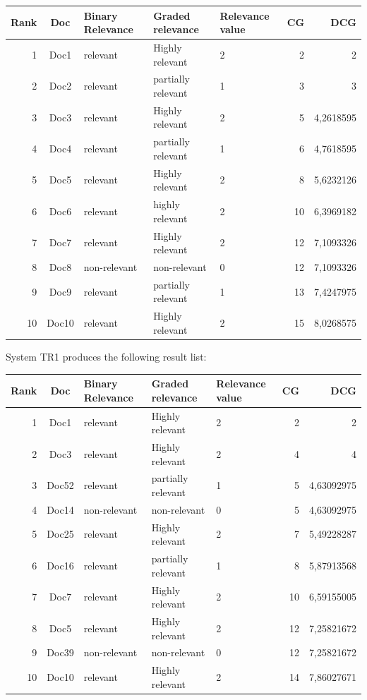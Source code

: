 \documentclass[a4paper,11pt]{article}
\begin{document}
\begin{tabular}{|r|c|p{1.8cm}|p{1.8cm}|p{1.8cm}|r|r|}
\hline
\textbf{Rank} & \textbf{Doc} & \textbf{Binary Relevance} & \textbf{Graded relevance} & \textbf{Relevance value} & \textbf{CG} & \textbf{DCG} \\ \hline
1 & Doc1 & relevant & Highly relevant & 2 & 2 & 2 \\ \hline
2 & Doc2 & relevant & partially relevant & 1 & 3 & 3 \\ \hline
3 & Doc3 & relevant & Highly relevant & 2 & 5 & 4,2618595 \\ \hline
4 & Doc4 & relevant & partially relevant & 1 & 6 & 4,7618595 \\ \hline
5 & Doc5 & relevant & Highly relevant & 2 & 8 & 5,6232126 \\ \hline
6 & Doc6 & relevant & highly relevant & 2 & 10 & 6,3969182 \\ \hline
7 & Doc7 & relevant & Highly relevant & 2 & 12 & 7,1093326 \\ \hline
8 & Doc8 & non-relevant & non-relevant & 0 & 12 & 7,1093326 \\ \hline
9 & Doc9 & relevant & partially relevant & 1 & 13 & 7,4247975 \\ \hline
10 & Doc10 & relevant & Highly relevant & 2 & 15 & 8,0268575 \\ \hline
\end{tabular}
\newline

System TR1 produces the following result list:
\newline

\begin{tabular}{|r|c|p{1.8cm}|p{1.8cm}|p{1.8cm}|r|r|}
\hline
\textbf{Rank} & \textbf{Doc} & \textbf{Binary Relevance} & \textbf{Graded relevance} & \textbf{Relevance value} & \textbf{CG} & \textbf{DCG} \\ \hline
1 & Doc1 & relevant & Highly relevant & 2 & 2 & 2 \\ \hline
2 & Doc3 & relevant & Highly relevant & 2 & 4 & 4 \\ \hline
3 & Doc52 & relevant & partially relevant & 1 & 5 & 4,63092975 \\ \hline
4 & Doc14 & non-relevant & non-relevant & 0 & 5 & 4,63092975 \\ \hline
5 & Doc25 & relevant & Highly relevant & 2 & 7 & 5,49228287 \\ \hline
6 & Doc16 & relevant & partially relevant & 1 & 8 & 5,87913568 \\ \hline
7 & Doc7 & relevant & Highly relevant & 2 & 10 & 6,59155005 \\ \hline
8 & Doc5 & relevant & Highly relevant & 2 & 12 & 7,25821672 \\ \hline
9 & Doc39 & non-relevant & non-relevant & 0 & 12 & 7,25821672 \\ \hline
10 & Doc10 & relevant & Highly relevant & 2 & 14 & 7,86027671 \\ \hline
\end{tabular}
\newline
\end{document}
